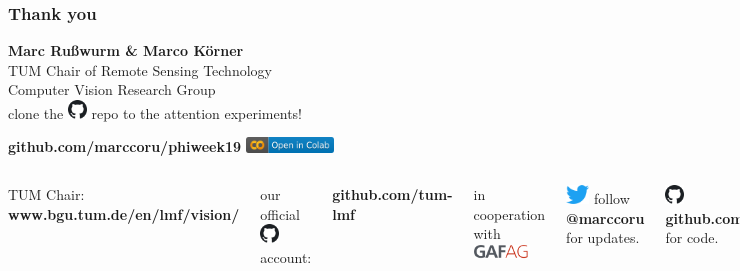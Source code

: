 \documentclass[%
  aspectratio=169,
  9pt,
  USenglish,
  light,
  mathserif,
  professionalfont,
  affiliationintitlepagehead,
  titlegraphic,
   affiliation,
]{beamer}
\begin{document}
\begin{frame}
	\frametitle{Thank you}
	\vspace{-1em}
	{\Large\centering 
		\textbf{Marc Rußwurm \& Marco Körner} \\
	
		TUM Chair of Remote Sensing Technology \\
		
		\centering Computer Vision Research Group \\
	
	
	\vspace{1em}
	clone the \includegraphics[width=5mm]{images/github} repo to the attention experiments! 
	
	\centering\textbf{github.com/marccoru/phiweek19}
	\includegraphics[height=4mm]{images/colab-badge.png}
	
}

	\vspace{2em}
	\Large 
	\begin{columns}[t]
		TUM Chair: \textbf{www.bgu.tum.de/en/lmf/vision/}
	
		our official \includegraphics[width=5mm]{images/github} account: 
		
		{\textbf{github.com/tum-lmf}}
		
		\vspace{1em}
		
		in cooperation with \includegraphics[height=1em]{images/GAF_logo}
		
		
		\includegraphics[height=5mm]{images/twitter} follow \textbf{@marccoru} for updates.
		
		\vspace{1em}
		\includegraphics[height=5mm]{images/github} \textbf{github.com/marccoru} for code.
		
		\vspace{1em}
		and \textbf{marccoru.github.io}
		
	\end{columns}

	
	
\end{frame}

%
%
\end{document}
